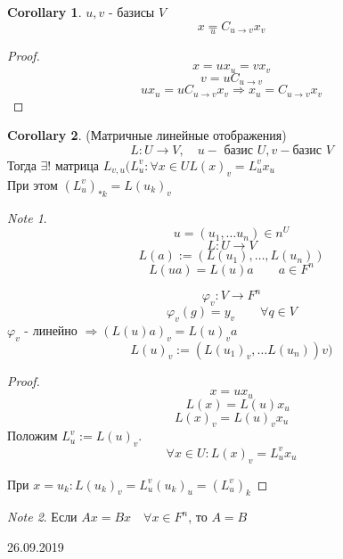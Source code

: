 \documentclass[11pt]{book}
\theoremstyle{definition}
\theoremstyle{plain}
\theoremstyle{plain}
\theoremstyle{definition}
\newtheorem*{cor}{Corollary}
\theoremstyle{remark}
\newtheorem*{note}{Note}
\begin{document}
\begin{cor}
    $u, v$ - базисы $V$
    $$x  \underset{u}= C_{u \to v} x_v$$
\end{cor}
\begin{proof}
    $$ x = ux_u = v x_v$$
    $$ v = u C_{u \to v}$$
    $$ ux_u = u C_{u \to v} x_v \Rightarrow x_u = C_{u \to v} x_v$$
\end{proof}
\begin{cor}
    (Матричные линейные отображения)\\
    $$ L: U \to V, \quad u - \mbox{ базис } U, v - \mbox{базис } V$$
    Тогда $\exists ! $ матрица $L_{v,u} (L_u^v: \forall x \in U L(x)_v = L_u^v x_u$\\
    При этом $(L_u^v)_{*k} = L(u_k)_v$
\end{cor}
\begin{note}
    $$u = (u_1, \ldots u_n) \in n^U$$
    $$L:U \to V$$
    $$L(a) := (L(u_1), \ldots, L(u_n))$$
    $$L(u a) = L(u) a \qquad a \in F^n$$

    $$\varphi_v : V \to F^n$$
    $$\varphi _v(g) = y_v \qquad \forall q \in V$$
    $\varphi_v$ - линейно $\Rightarrow (L(u) a) _v = L(u)_v a$
    $$ L(u)_v := (L(u_1)_v, \ldots L(u_n))v)$$
\end{note}
\begin{proof}
    $$x = u x_u$$ $$ \quad L(x) = L(u) x_u$$
    $$ L(x)_v = L(u)_v x_u$$
    Положим $L_u^v := L(u)_v$.\\
    $$ \forall x \in U : L(x) _v = L_u^v x_u$$
    
    При $x = u_k : L(u_k)_v = L_u ^v (u_k)_u = (L_u^v)_k$
\end{proof}
\begin{note}
    Если $Ax = Bx \quad \forall x \in F^n$, то $A=B$
\end{note}

26.09.2019
\end{document}
